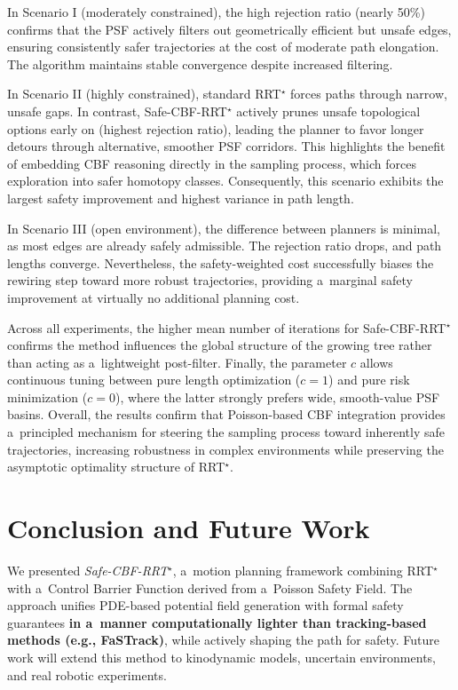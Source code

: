 \documentclass[letterpaper, 10 pt, conference]{ieeeconf}
\begin{document}
In Scenario I (moderately constrained), the high rejection ratio (nearly 50\%) confirms that the PSF actively filters out geometrically efficient but unsafe edges, ensuring consistently safer trajectories at the cost of moderate path elongation. The algorithm maintains stable convergence despite increased filtering.

In Scenario II (highly constrained), standard RRT$^\star$ forces paths through narrow, unsafe gaps. In contrast, Safe-CBF-RRT$^\star$ actively prunes unsafe topological options early on (highest rejection ratio), leading the planner to favor longer detours through alternative, smoother PSF corridors. This highlights the benefit of embedding CBF reasoning directly in the sampling process, which forces exploration into safer homotopy classes. Consequently, this scenario exhibits the largest safety improvement and highest variance in path length.

In Scenario III (open environment), the difference between planners is minimal, as most edges are already safely admissible. The rejection ratio drops, and path lengths converge. Nevertheless, the safety-weighted cost successfully biases the rewiring step toward more robust trajectories, providing a~marginal safety improvement at virtually no additional planning cost.

Across all experiments, the higher mean number of iterations for Safe-CBF-RRT$^\star$ confirms the method influences the global structure of the growing tree rather than acting as a~lightweight post-filter. Finally, the parameter $c$ allows continuous tuning between pure length optimization ($c=1$) and pure risk minimization ($c=0$), where the latter strongly prefers wide, smooth-value PSF basins. Overall, the results confirm that Poisson-based CBF integration provides a~principled mechanism for steering the sampling process toward inherently safe trajectories, increasing robustness in complex environments while preserving the asymptotic optimality structure of RRT$^\star$.

\section{Conclusion and Future Work}
We presented \emph{Safe-CBF-RRT$^\star$}, a~motion planning framework combining RRT$^\star$
with a~Control Barrier Function derived from a~Poisson Safety Field. The
approach unifies PDE-based potential field generation with formal safety
guarantees \textbf{in a~manner computationally lighter than tracking-based methods (e.g., FaSTrack)}, while actively shaping the path for safety. Future work will extend this method to kinodynamic models, uncertain
environments, and real robotic experiments.



\end{document}
